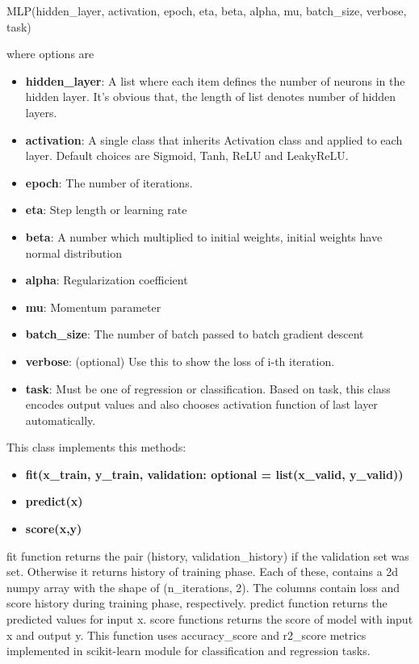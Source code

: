 \documentclass[10pt]{SelfArx} %
\begin{document}
	\begin{python}
MLP(hidden_layer, activation,
epoch, eta, beta, alpha, mu,
batch_size, verbose, task)
	\end{python}
	where options are
	\begin{itemize}
		\item \textbf{hidden\_layer}: A list where each item defines the number of neurons in the hidden layer. It's obvious that, the length of list denotes number of hidden layers.
		\item \textbf{activation}: A single class that inherits Activation class and applied to each layer. Default choices are Sigmoid, Tanh, ReLU and LeakyReLU.
		\item \textbf{epoch}: The number of iterations.
		\item \textbf{eta}: Step length or learning rate
		\item \textbf{beta}: A number which multiplied to initial weights, initial weights have normal distribution
		\item \textbf{alpha}: Regularization coefficient
		\item \textbf{mu}: Momentum parameter
		\item \textbf{batch\_size}: The number of batch passed to batch gradient descent
		\item \textbf{verbose}: (optional) Use this to show the loss of i-th iteration.
		
		\item \textbf{task}: Must be one of regression or classification. Based on task, this class encodes output values and also chooses activation function of last layer automatically.
	\end{itemize}
	This class implements this methods:
	\begin{itemize}
		\item  \textbf{fit(x\_train, y\_train, validation: optional = list(x\_valid, y\_valid))}
		\item  \textbf{predict(x)}
		\item  \textbf{score(x,y)
		}
	\end{itemize}
	fit function returns the pair (history, validation\_history) if the validation set was set. Otherwise it returns history of training phase. Each of these, contains a 2d numpy array with the shape of (n\_iterations, 2). The columns contain loss and score history during training phase, respectively.
	predict function returns the predicted values for input x.
	score functions returns the score of model with input x and output y. This function uses accuracy\_score and r2\_score metrics implemented in scikit-learn module for classification and regression tasks.
	
\end{document}
